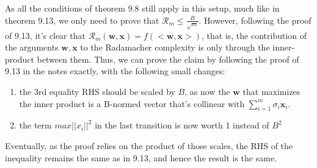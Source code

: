 As all the conditions of theorem 9.8 still apply in this setup, much like in theorem 9.13, we only need to prove that $\mathcal{R}_m \leq \frac{B}{\sqrt{m}}$. However, following the proof of 9.13, it's clear that $\mathcal{R}_m(\boldsymbol{w}, \boldsymbol{x}) = f(<\boldsymbol{w}, \boldsymbol{x}>)$, that is, the contribution of the arguments $\boldsymbol{w}, \boldsymbol{x}$ to the Radamacher complexity is only through the inner-product between them. Thus, we can prove the claim by following the proof of 9.13 in the notes exactly, with the following small changes:

\begin{enumerate}
    \item the 3rd equality RHS should be scaled by $B$, as now the $\boldsymbol{w}$ that maximizes the inner product is a B-normed vector that's collinear with $\sum_{i=1}^m \sigma_i \boldsymbol{x}_i$.
    \item the term $max||x_i||^2$ in the last transition is now worth 1 instead of $B^2$
\end{enumerate}
Eventually, as the proof relies on the product of those scales, the RHS of the inequality remains the same as in 9.13, and hence the result is the same. 

